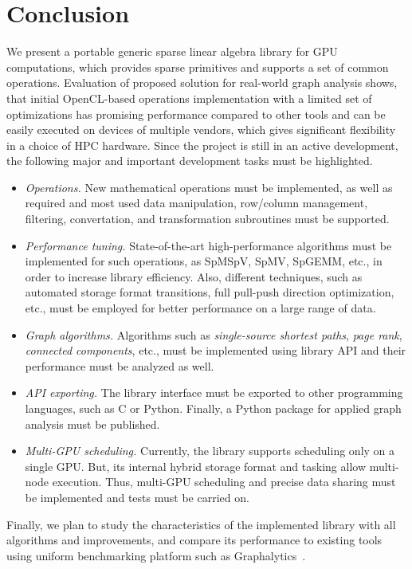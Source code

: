\section{Conclusion}

We present a portable generic sparse linear algebra library for GPU computations, which provides sparse primitives and supports a set of common operations. Evaluation of proposed solution for real-world graph analysis shows, that initial OpenCL-based operations implementation with a limited set of optimizations has promising performance compared to other tools and can be easily executed on devices of multiple vendors, which gives significant flexibility in a choice of HPC hardware. Since the project is still in an active development, the following major and important development tasks must be highlighted.

\begin{itemize}
    \item \textit{Operations.} New mathematical operations must be implemented, as well as required and most used data manipulation, row/column management, filtering, convertation, and transformation subroutines must be supported.
    
    \item \textit{Performance tuning.} State-of-the-art high-performance algorithms must be implemented for such operations, as SpMSpV, SpMV, SpGEMM, etc., in order to increase library efficiency. Also, different techniques, such as automated storage format transitions, full pull-push direction optimization, etc., must be employed for better performance on a large range of data.
    
    \item \textit{Graph algorithms.} Algorithms such as \textit{single-source shortest paths}, \textit{page rank}, \textit{connected components}, etc., must be implemented using library API and their performance must be analyzed as well. 
    
    \item \textit{API exporting.} The library interface must be exported to other programming languages, such as C or Python. Finally, a Python package for applied graph analysis must be published.
    
    \item \textit{Multi-GPU scheduling.} Currently, the library supports scheduling only on a single GPU. But, its internal hybrid storage format and tasking allow multi-node execution. Thus, multi-GPU scheduling and precise data sharing must be implemented and tests must be carried on.
\end{itemize}

Finally, we plan to study the characteristics of the implemented library with all algorithms and improvements, and compare its performance to existing tools using uniform benchmarking platform such as Graphalytics~\cite{Graphalytics:iosup2021ldbc}. 